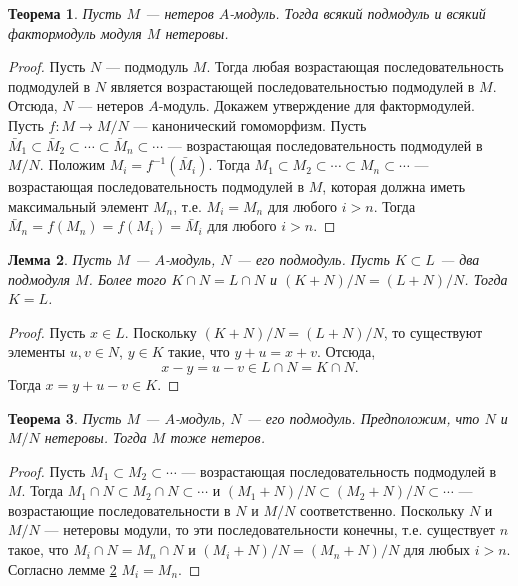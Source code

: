 \documentclass[12pt, titlepage, oneside]{amsbook}
\newtheorem{theorem}{Теорема}[chapter]
\newtheorem{lemma}[theorem]{Лемма}
\theoremstyle{definition}
\theoremstyle{remark}
\begin{document}
\begin{theorem}
	\label{Net2}
	Пусть $M$ --- нетеров $A$-модуль. Тогда всякий подмодуль и всякий фактормодуль модуля $M$ нетеровы.
\end{theorem}

\begin{proof}
	Пусть $N$ --- подмодуль $M$. Тогда любая возрастающая последовательность подмодулей в $N$ является возрастающей последовательностью подмодулей в $M$. Отсюда, $N$ --- нетеров $A$-модуль. Докажем утверждение для фактормодулей.
	Пусть $f\colon M\rightarrow M/N$ --- канонический гомоморфизм. Пусть $\bar{M}_1\subset \bar{M}_2\subset\cdots\subset \bar{M}_n\subset\cdots$ --- возрастающая последовательность подмодулей в $M/N$. Положим $M_i=f^{-1}(\bar{M}_i)$. Тогда $M_1\subset M_2\subset\cdots\subset M_n\subset\cdots$ --- возрастающая последовательность подмодулей в $M$, которая должна иметь максимальный элемент $M_n$, т.е. $M_i=M_n$ для любого $i>n$. Тогда $\bar{M}_n=f(M_n)=f(M_i)=\bar{M}_i$ для любого $i>n$.
\end{proof}

\begin{lemma}
	\label{NetL}
	Пусть $M$ --- $A$-модуль, $N$ --- его подмодуль. Пусть $K\subset L$ --- два подмодуля $M$. Более того $K\cap N= L\cap N$ и $(K+N)/N=(L+N)/N$. Тогда $K=L$.
\end{lemma}

\begin{proof}
	Пусть $x\in L$. Поскольку $(K+N)/N=(L+N)/N$, то существуют элементы $u,v\in N$, $y\in K$ такие, что $y+u=x+v$. Отсюда, $$x-y=u-v\in L\cap N=K\cap N.$$ Тогда $x=y+u-v\in K$.
\end{proof}


\begin{theorem}
	\label{Net3}
	Пусть $M$ --- $A$-модуль, $N$ --- его подмодуль. Предположим, что $N$ и $M/N$ нетеровы. Тогда $M$ тоже нетеров.
\end{theorem}

\begin{proof}
	Пусть $M_1\subset M_2\subset\cdots$ --- возрастающая последовательность подмодулей в $M$. Тогда $M_1\cap N\subset M_2\cap N\subset\cdots$ и $(M_1+N)/N\subset (M_2+N)/N\subset\cdots$ --- возрастающие последовательности в $N$ и $M/N$ соответственно. Поскольку $N$ и $M/N$ --- нетеровы модули, то эти последовательности конечны, т.е. существует $n$ такое, что $M_i\cap N=M_n\cap N$ и $(M_i+N)/N=(M_n+N)/N$ для любых $i>n$. Согласно лемме \ref{NetL} $M_i=M_n$.
\end{proof}
\end{document}
